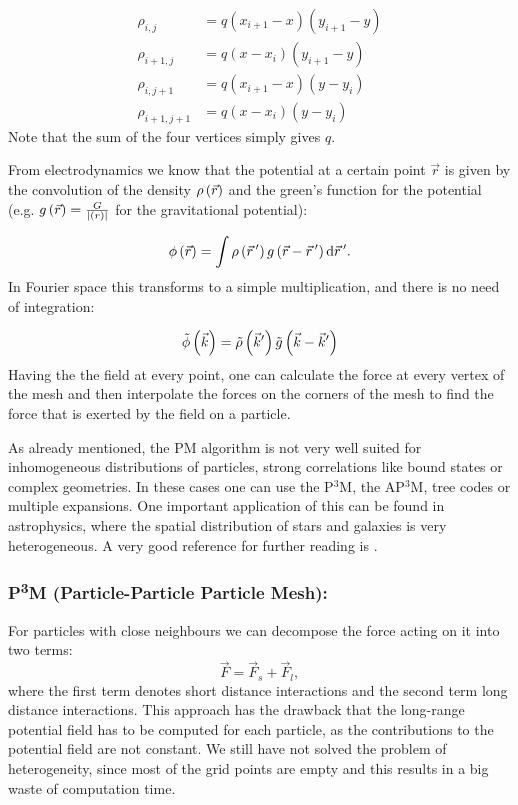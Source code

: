 \begin{align*}
\rho_{i,j} &= q(x_{i+1}-x)(y_{i+1}-y) \\
\rho_{i+1,j} &= q(x-x_{i})(y_{i+1}-y) \\
\rho_{i,j+1} &= q(x_{i+1}-x)(y-y_{i}) \\
\rho_{i+1,j+1} &= q(x-x_{i})(y-y_{i}) 
\end{align*}
Note that the sum of the four vertices simply gives $q$.


From electrodynamics we know that the potential at a certain point $\vec{r}$ is given by the convolution of the density $\rho\left(\vec{r}\right)$ and the green's function for the potential (e.g. $g\left(\vec{r}\right)= \frac{G}{\left|\left(r\right)\right|}$ for the gravitational potential):

\begin{equation}
\phi\left(\vec{r}\right) = \int \rho \left(\vec{r}\,'\right)g\left(\vec{r}-\vec{r}\,'\right)\text{d}\vec{r}\,'.
\end{equation}
In Fourier space this transforms to a simple multiplication, and there is no need of integration:

\begin{equation}
\tilde{\phi}\left(\vec{k}\right) = \tilde{\rho} \left(\vec{k}'\right)\tilde{g}\left(\vec{k}-\vec{k}'\right)
\end{equation}
Having the the field at every point, one can calculate the force at every vertex of the mesh and then interpolate  the forces on the corners of the mesh to find the force that is exerted by the field on a particle.


As already mentioned, the PM algorithm is  not very well suited for inhomogeneous distributions of particles, strong correlations like bound states or complex geometries. In these cases one can use  the P$^3$M, the AP$^3$M, tree codes or multiple expansions. One important application of this can be found in astrophysics, where the spatial distribution of stars and galaxies is very heterogeneous. A very good reference for further reading is \citet{pfalzner}.

\subsubsection*{P\textsuperscript{3}M (Particle-Particle Particle Mesh):}

For particles with close neighbours we can decompose the force acting on it into two terms:
\begin{equation}
\vec{F} = \vec{F}_s + \vec{F}_l,
\end{equation}
where the first term denotes short distance interactions and the second term  long distance interactions. This approach has the drawback that the long-range potential field has to be computed for each particle, as the contributions to the potential field are not constant. We still have not solved the problem of heterogeneity, since most of the grid points are empty and this results in a big waste of computation time.

